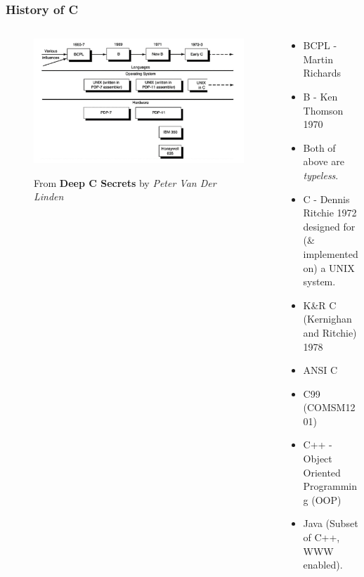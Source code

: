 \begin{frame}%
\frametitle{History of C}

\begin{columns}
\begin{column}{0.5\textwidth}

\begin{figure}[h]
\centerline{
\includegraphics[width=1.0\textwidth]{../Figs/evolvec.jpg}
}\centerline{
{\tiny From {\bf Deep C Secrets} by {\it Peter Van Der Linden}}
}
\end{figure}
\end{column}

\begin{column}{0.5\textwidth}
\begin{itemize}[<+->]
\item BCPL - Martin Richards
\item B - Ken Thomson 1970
\item Both of above are {\em typeless}.
\item C - Dennis Ritchie 1972 designed for\\(\& implemented on) a UNIX system.
\item K\&R C (Kernighan and Ritchie) 1978
\item ANSI C
\item C99 (COMSM1201)
\item C++ - Object Oriented Programming (OOP)
\item Java (Subset of C++, WWW enabled).
\end{itemize}
\end{column}
\end{columns}
\end{frame}


